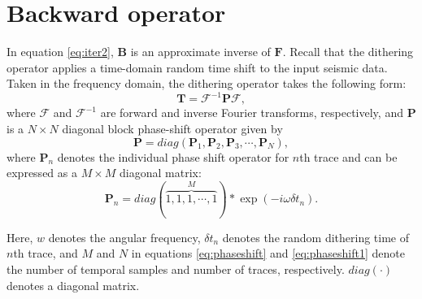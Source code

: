 \section{Backward operator}
In equation \ref{eq:iter2}, $\mathbf{B}$ is an approximate inverse of $\mathbf{F}$. 
Recall that the dithering operator applies a time-domain random time shift to the input seismic data. Taken in the frequency domain, the dithering operator takes the following form: 
\begin{equation}
\label{eq:ditherf}
\mathbf{T} = \mathbf{\mathcal{F}}^{-1}\mathbf{P}\mathbf{\mathcal{F}},
\end{equation}
where $\mathbf{\mathcal{F}}$ and $\mathbf{\mathcal{F}}^{-1}$ are forward and inverse Fourier transforms, respectively, and $\mathbf{P}$ is a $N\times N$ diagonal block phase-shift operator given by
\begin{equation}
\label{eq:phaseshift}
\mathbf{P}=diag(\mathbf{P}_1, \mathbf{P}_2, \mathbf{P}_3, \cdots, \mathbf{P}_N),
\end{equation}
where 
$\mathbf{P}_n$ denotes the individual phase shift operator for $n$th trace and can be expressed as a $M\times M$ diagonal matrix:
\begin{equation}
\label{eq:phaseshift1}
\mathbf{P}_n = diag(\overbrace{1,1,1, \cdots, 1}^{M})*\exp(-i\omega\delta t_n).
\end{equation}

Here, $w$ denotes the angular frequency, $\delta t_n$ denotes the random dithering time of $n$th trace, and $M$ and $N$ in equations \ref{eq:phaseshift} and \ref{eq:phaseshift1} denote the number of temporal samples and number of traces, respectively. $diag(\cdot)$ denotes a diagonal matrix. 

